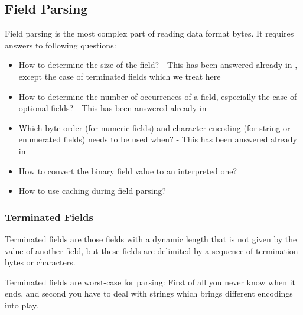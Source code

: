 \subsection{Field Parsing}%
\label{sec:FieldParsing}%

Field parsing is the most complex part of reading data format bytes. It requires answers to following questions:
\begin{itemize}
\item How to determine the size of the field? - This has been answered already in , except the case of terminated fields which we treat here
\item How to determine the number of occurrences of a field, especially the case of optional fields? - This has been answered already in 
\item Which byte order (for numeric fields) and character encoding (for string or enumerated fields) needs to be used when? - This has been answered already in 
\item How to convert the binary field value to an interpreted one?
\item How to use caching during field parsing?
\end{itemize}

\subsubsection{Terminated Fields}%
\label{sec:TerminatedFields}%

Terminated fields are those fields with a dynamic length that is not given by the value of another field, but these fields are delimited by a sequence of termination bytes or characters. 

Terminated fields are worst-case for parsing: First of all you never know when it ends, and second you have to deal with strings which brings different encodings into play.


